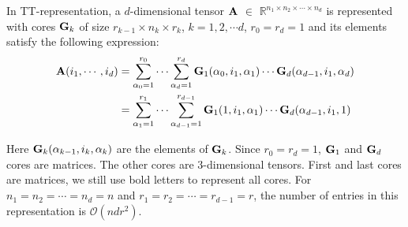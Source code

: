 \documentclass[runningheads]{llncs}
\newcommand{\tensor}[1]{{\cal\textbf{#1}\xspace}}
\begin{document}
In TT-representation, a $d$-dimensional tensor $\tensor{A}$ $\in$ $\mathbb{R}^{n_1 \times n_2 \times \cdots \times n_d}$ is represented with cores $\tensor{G}_k$ of size $r_{k-1}\times n_k\times r_k$, $k=1,2,\cdots d$, $r_0=r_d=1$ and its elements satisfy the following expression:
{\small\begin{align*}
	\tensor{A}(i_1,\cdots ,i_d) 
	&= \sum_{\alpha_0 = 1}^{r_0} \cdots \sum_{\alpha_d = 1}^{r_d} \tensor{G}_1(\alpha_0, i_1, \alpha_1) \cdots \tensor{G}_d(\alpha_{d-1}, i_1, \alpha_d)\\
	&= \sum_{\alpha_1 = 1}^{r_1} \cdots \sum_{\alpha_{d-1} = 1}^{r_{d-1}} \tensor{G}_1(1, i_1, \alpha_1) \cdots \tensor{G}_d(\alpha_{d-1}, i_1, 1)
	\end{align*}}

Here $\tensor{G}_k(\alpha_{k-1}, i_k, \alpha_k)$ are the elements of $\tensor{G}_k$. Since $r_0=r_d=1$, $\tensor{G}_1$ and $\tensor{G}_d$ cores are matrices. The other cores are $3$-dimensional tensors. First and last cores are matrices, we still use bold letters to represent all cores. For $n_1=n_2=\cdots=n_d=n$ and $r_1=r_2=\cdots=r_{d-1}=r$, the number of entries in this representation is $\mathcal{O}(ndr^2)$.
\end{document}
